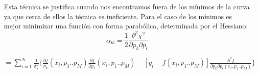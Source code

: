\documentclass[a4paper,openright,12pt]{book}
\begin{document}
Esta técnica se justifica cuando nos encontramos fuera de los mínimos de la curva ya que cerca de ellos la técnica es ineficiente. 
Para el caso de los mínimos  es mejor minimizar una función con forma parabólica, determinada por el Hessiano:
\begin{equation}\label{doble}
\alpha_{kl}=
\frac{1}{2}\frac{\partial^{2}\chi^{2}}{\partial p_{k}\partial p_{l}
}
\end{equation}
\begin{large}
\begin{center}
$
=\sum_{i=1}^{N}\frac{1}{\sigma_{i}^{2}}\{\frac{\partial f}{p_{k}}(x_{i},p_1..p_{M})\frac{\partial f}{\partial p_{1}}(x_{i},p_{1}..p_{M})-[y_{i}-f(x_{i},p_{1}..p_{M})]\frac{\partial^{2}f}{\partial p_{k}\partial p_{l}(x_{i},p_{1}..p_{M})}\}
$
\end{center}
\end{large}
\end{document}
